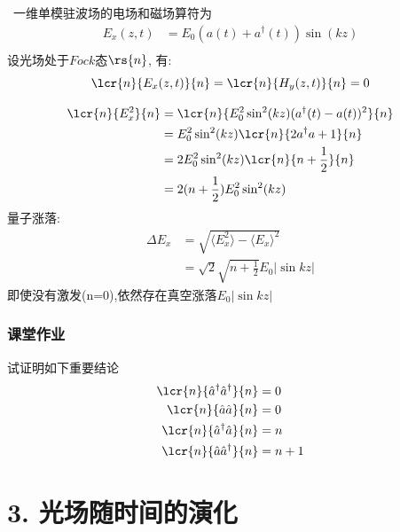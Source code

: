 \begin{frame}
    \frametitle{}
    \解~一维单模驻波场的电场和磁场算符为  
    \[ \begin{aligned}
      E_x(z,t)
      &= E_0  (a(t)+a^\dagger(t) )\sin (kz) \\
   \end{aligned} \]
   设光场处于$Fock$态$\rs{n}$, 有:
   \[ \lcr{n}{E_x(z,t)}{n} = \lcr{n}{H_y(z,t)}{n} =0\]
  \end{frame}

  \begin{frame}
   \[ \begin{aligned}
     \lcr{n}{E^2_x}{n} &= \lcr{n}{E^2_0 \sin^2 (kz) (a^\dagger(t)-a(t))^2}{n} \\
     &= E^2_0 \sin^2 (kz) \lcr{n}{2a^\dagger a+1}{n} \\ 
     &= 2 E^2_0 \sin^2 (kz) \lcr{n}{n+\frac{1}{2}}{n} \\ 
     &= 2 (n+\frac{1}{2})E^2_0 \sin^2 (kz)  
  \end{aligned} \]
  量子涨落: 
  \[
 \begin{aligned}
        \Delta E_x &= \sqrt{\langle E^2_x\rangle - \langle E_x\rangle ^2} \\
        &= \sqrt{2} \sqrt{n+\frac{1}{2}} E_0 \left|\sin kz \right| 
 \end{aligned} \]
 即使没有激发(n=0),依然存在真空涨落$ E_0 \left|\sin kz \right|  $  
\end{frame}

\begin{frame}
  \frametitle{课堂作业}
   \begin{block}{试证明如下重要结论}
   \[
  \begin{aligned}
   \lcr{n}{\hat{a} ^\dagger\hat{a} ^\dagger}{n} & = 0   \\     
   \lcr{n}{\hat{a} \hat{a} }{n} & =0   \\  
   \lcr{n}{\hat{a} ^\dagger\hat{a} }{n} & = n   \\   
   \lcr{n}{\hat{a} \hat{a} ^\dagger}{n} & = n+1   \\    
  \end{aligned}
  \]
   \end{block}
\end{frame}

\section{3. 光场随时间的演化}

